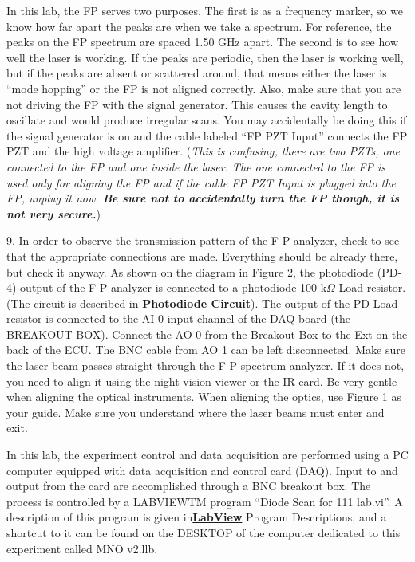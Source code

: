 \documentclass{../lab}
\begin{document}
In this lab, the FP serves two purposes. The first is as a frequency marker, so we know how far apart the peaks are when we take a spectrum. For reference, the peaks on the FP spectrum are spaced 1.50 GHz apart. The second is to see how well the laser is working. If the peaks are periodic, then the laser is working well, but if the peaks are absent or scattered around, that means either the laser is ``mode hopping'' or the FP is not aligned correctly. Also, make sure that you are not driving the FP with the signal generator. This causes the cavity length to oscillate and would produce irregular scans. You may accidentally be doing this if the signal generator is on and the cable labeled ``FP PZT Input'' connects the FP PZT and the high voltage amplifier. (\emph{This is confusing, there are two PZTs, one connected to the FP and one inside the laser. The one connected to the FP is used only for aligning the FP and if the cable FP PZT Input is plugged into the FP, unplug it now. \textbf{ Be sure not to accidentally turn the FP though, it is not very secure.}})

9. In order to observe the transmission pattern of the F-P analyzer, check to see that the appropriate connections are made. Everything should be already there, but check it anyway. As shown on the diagram in Figure 2, the photodiode (PD-4) output of the F-P analyzer is connected to a photodiode 100 k$ \Omega $ Load resistor. (The circuit is described in \href{http://dev-physicsadv.pantheon.berkeley.edu/node/120}{\textbf{Photodiode Circuit}}). The output of the PD Load resistor is connected to the AI 0 input channel of the DAQ board (the BREAKOUT BOX). Connect the AO 0 from the Breakout Box to the Ext on the back of the ECU. The BNC cable from AO 1 can be left disconnected. Make sure the laser beam passes straight through the F-P spectrum analyzer. If it does not, you need to align it using the night vision viewer or the IR card. Be very gentle when aligning the optical instruments. When aligning the optics, use Figure 1 as your guide. Make sure you understand where the laser beams must enter and exit.

In this lab, the experiment control and data acquisition are performed using a PC computer equipped with data acquisition and control card (DAQ). Input to and output from the card are accomplished through a BNC breakout box. The process is controlled by a LABVIEWTM program ``Diode Scan for 111 lab.vi''. A description of this program is given in\href{http://dev-physicsadv.pantheon.berkeley.edu/node/119}{\textbf{}}\href{http://dev-physicsadv.pantheon.berkeley.edu/node/119}{\textbf{LabView}} Program Descriptions, and a shortcut to it can be found on the DESKTOP of the computer dedicated to this experiment called MNO v2.llb.
\end{document}
